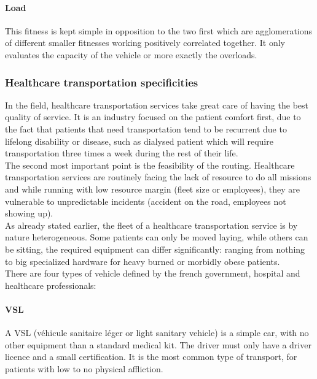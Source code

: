 \documentclass[12pt]{memoir}
\begin{document}
\paragraph{Load} %
This fitness is kept simple in opposition to the two first which are agglomerations
of different smaller fitnesses working positively correlated together. It only
evaluates the capacity of the vehicle or more exactly the overloads.
\label{par:Load}


\subsubsection{Healthcare transportation specificities}
\label{sub:Healthcare transportation specificities}
In the field, healthcare transportation services take great care of having the best
quality of service. It is an industry focused on the patient comfort first, due to the
fact that patients that need transportation tend to be recurrent due to lifelong
disability or disease, such as dialysed patient which will require transportation three
times a week during the rest of their life. \\
The second most important point is the feasibility of the routing. Healthcare
transportation services are routinely facing the lack of resource to do all missions
and while running with low resource margin (fleet size or employees), they are
vulnerable to unpredictable incidents (accident on the road, employees not showing
up).\\

As already stated earlier, the fleet of a healthcare transportation service is by
nature heterogeneous. Some patients can only be moved laying, while others can be sitting,
the required equipment can differ significantly: ranging from nothing to big specialized
hardware for heavy burned or morbidly obese patients.\\
There are four types of vehicle defined by the french government, hospital and healthcare professionals:

\paragraph{VSL} %
\label{par:VSL}
A VSL (véhicule sanitaire léger or light sanitary vehicle) is a simple car, with no
other equipment than a standard medical kit. The driver must only have a driver
licence and a small certification. It is the most common type of transport, for
patients with low to no physical affliction.
\end{document}

